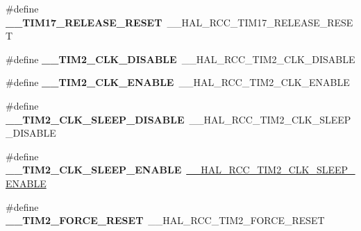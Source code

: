 \begin{DoxyCompactItemize}
\item 
\hypertarget{group___h_a_l___r_c_c___aliased_gab8e7ecf7c59c1db06b2ba69bd7527e3f}{\#define {\bfseries \-\_\-\-\_\-\-T\-I\-M17\-\_\-\-R\-E\-L\-E\-A\-S\-E\-\_\-\-R\-E\-S\-E\-T}~\-\_\-\-\_\-\-H\-A\-L\-\_\-\-R\-C\-C\-\_\-\-T\-I\-M17\-\_\-\-R\-E\-L\-E\-A\-S\-E\-\_\-\-R\-E\-S\-E\-T}\label{group___h_a_l___r_c_c___aliased_gab8e7ecf7c59c1db06b2ba69bd7527e3f}

\item 
\hypertarget{group___h_a_l___r_c_c___aliased_ga44d19f521b4c0161d7fb28c96bf5fbb7}{\#define {\bfseries \-\_\-\-\_\-\-T\-I\-M2\-\_\-\-C\-L\-K\-\_\-\-D\-I\-S\-A\-B\-L\-E}~\-\_\-\-\_\-\-H\-A\-L\-\_\-\-R\-C\-C\-\_\-\-T\-I\-M2\-\_\-\-C\-L\-K\-\_\-\-D\-I\-S\-A\-B\-L\-E}\label{group___h_a_l___r_c_c___aliased_ga44d19f521b4c0161d7fb28c96bf5fbb7}

\item 
\hypertarget{group___h_a_l___r_c_c___aliased_gae06cbd87c2db5dbb2aee0d47888374af}{\#define {\bfseries \-\_\-\-\_\-\-T\-I\-M2\-\_\-\-C\-L\-K\-\_\-\-E\-N\-A\-B\-L\-E}~\-\_\-\-\_\-\-H\-A\-L\-\_\-\-R\-C\-C\-\_\-\-T\-I\-M2\-\_\-\-C\-L\-K\-\_\-\-E\-N\-A\-B\-L\-E}\label{group___h_a_l___r_c_c___aliased_gae06cbd87c2db5dbb2aee0d47888374af}

\item 
\hypertarget{group___h_a_l___r_c_c___aliased_ga6f8e4c63d5473a6af21a776fb1c20d1d}{\#define {\bfseries \-\_\-\-\_\-\-T\-I\-M2\-\_\-\-C\-L\-K\-\_\-\-S\-L\-E\-E\-P\-\_\-\-D\-I\-S\-A\-B\-L\-E}~\-\_\-\-\_\-\-H\-A\-L\-\_\-\-R\-C\-C\-\_\-\-T\-I\-M2\-\_\-\-C\-L\-K\-\_\-\-S\-L\-E\-E\-P\-\_\-\-D\-I\-S\-A\-B\-L\-E}\label{group___h_a_l___r_c_c___aliased_ga6f8e4c63d5473a6af21a776fb1c20d1d}

\item 
\hypertarget{group___h_a_l___r_c_c___aliased_gaad6d1c9176e1ca4c3eb67bfbd1d3be57}{\#define {\bfseries \-\_\-\-\_\-\-T\-I\-M2\-\_\-\-C\-L\-K\-\_\-\-S\-L\-E\-E\-P\-\_\-\-E\-N\-A\-B\-L\-E}~\hyperlink{group___r_c_c___peripheral___clock___sleep___enable___disable_ga975142c90b4e1baf21b361524518235d}{\-\_\-\-\_\-\-H\-A\-L\-\_\-\-R\-C\-C\-\_\-\-T\-I\-M2\-\_\-\-C\-L\-K\-\_\-\-S\-L\-E\-E\-P\-\_\-\-E\-N\-A\-B\-L\-E}}\label{group___h_a_l___r_c_c___aliased_gaad6d1c9176e1ca4c3eb67bfbd1d3be57}

\item 
\hypertarget{group___h_a_l___r_c_c___aliased_ga436568ac94926e275ddcb03dc505af7d}{\#define {\bfseries \-\_\-\-\_\-\-T\-I\-M2\-\_\-\-F\-O\-R\-C\-E\-\_\-\-R\-E\-S\-E\-T}~\-\_\-\-\_\-\-H\-A\-L\-\_\-\-R\-C\-C\-\_\-\-T\-I\-M2\-\_\-\-F\-O\-R\-C\-E\-\_\-\-R\-E\-S\-E\-T}\label{group___h_a_l___r_c_c___aliased_ga436568ac94926e275ddcb03dc505af7d}


\end{DoxyCompactItemize}
